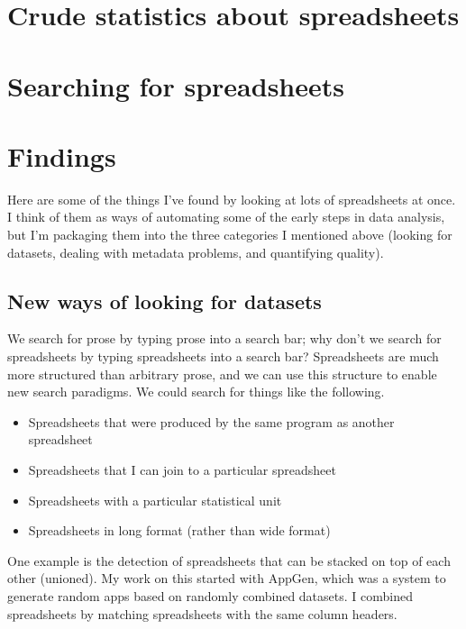 \documentclass{acm_proc_article-sp}
\begin{document}
\section{Crude statistics about spreadsheets}




\section{Searching for spreadsheets}







\section{Findings}
Here are some of the things I've found by looking at lots of spreadsheets at
once. I think of them as ways of automating some of the early steps in data
analysis, but I'm packaging them into the three categories I mentioned above
(looking for datasets, dealing with metadata problems, and quantifying quality).

\subsection{New ways of looking for datasets}
We search for prose by typing prose into a search bar; why don't
we search for spreadsheets by typing spreadsheets into a search bar?
Spreadsheets are much more structured than arbitrary prose, and we
can use this structure to enable new search paradigms. We could search
for things like the following.

\begin{itemize}
\item Spreadsheets that were produced by the same program as another spreadsheet
\item Spreadsheets that I can join to a particular spreadsheet
\item Spreadsheets with a particular statistical unit
\item Spreadsheets in long format (rather than wide format)
\end{itemize}

One example is the detection of spreadsheets that can be stacked on top of
each other (unioned).
My work on this started with AppGen,\cite{appgen} which was a system to
generate random apps based on randomly combined datasets. I combined spreadsheets
by matching spreadsheets with the same column headers.
\end{document}
